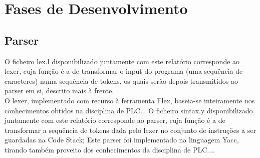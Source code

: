 \documentclass{report}
\begin{document}
\noindent
\par
\begin{Parallel}[v]{0.48\textwidth}{0.48\textwidth}
\ParallelPar
\end{Parallel}

\section{Fases de Desenvolvimento}
\subsection{Parser}







\null\quad O ficheiro lex.l disponibilizado juntamente com este relatório corresponde ao lexer, cuja função é a
de transformar o input do programa (uma sequência de caracteres) numa sequência de tokens, os quais serão depois
transmitidos ao parser em si, descrito mais à frente.\\
\null\quad O lexer, implementado com recurso à ferramenta Flex, baseia-se inteiramente nos conhecimentos obtidos na disciplina de PLC...
O ficheiro sintax.y disponibilizado juntamente com este relatório corresponde ao parser, cuja função é
a de transformar a sequência de tokens dada pelo lexer no conjunto de instruções a ser guardadas na Code Stack; Este parser foi
implementado na linguagem Yacc, tirando também proveito dos conhecimentos da disciplina de PLC....\\
\end{document}
